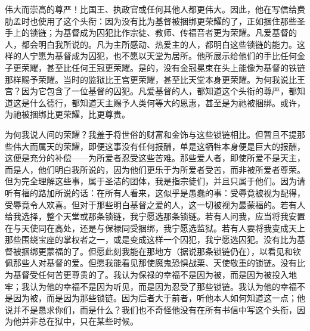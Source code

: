 伟大而崇高的尊严！比国王、执政官或任何其他人都更伟大。因此，他在写信给费肋孟时也使用了这个头衔：因为没有比为基督被捆绑更荣耀的了，正如捆住那些圣手上的锁链；为基督成为囚犯比作宗徒、教师、传福音者更为荣耀。凡爱基督的人，都会明白我所说的。凡为主所感动、热爱主的人，都明白这些锁链的能力。这样的人宁愿为基督成为囚犯，也不愿以天堂为居所。他所展示给他们的手比任何金子更荣耀，甚至比任何王冠更荣耀。是的，没有金冠冕束在头上能像为基督的铁链那样赐予荣耀。当时的监狱比王宫更荣耀，甚至比天堂本身更荣耀。为何我说比王宫？因为它包含了一位基督的囚犯。凡爱基督的人，都知道这个头衔的尊严，都知道这是什么德行，都知道天主赐予人类何等大的恩惠，甚至是为祂被捆绑。或许，为祂被捆绑比更荣耀，比更尊贵。\par

为何我说人间的荣耀？我羞于将世俗的财富和金饰与这些锁链相比。但暂且不提那些伟大而属天的荣耀，即便这事没有任何报酬，单是这牺牲本身便是巨大的报酬，这便是充分的补偿——为所爱者忍受这些苦难。那些爱人者，即使所爱不是天主，而是人，他们明白我所说的，因为他们更乐于为所爱者受苦，而非被所爱者尊荣。但为完全理解这些事，属于圣洁的团体，我是指宗徒们，并且只属于他们。因为请听有福的路加所说的话：在所有人看来，这似乎是愚蠢的事：受辱竟被视为配得，受辱竟令人欢喜。但对于那些明白基督之爱的人，这一切被视为最蒙福的。若有人给我选择，整个天堂或那条锁链，我宁愿选那条锁链。若有人问我，应当将我安置在与天使同在高处，还是与保禄同受捆绑，我宁愿选监狱。若有人要将我变成天上那些围绕宝座的掌权者之一，或是变成这样一个囚犯，我宁愿选囚犯。没有比为基督被捆绑更蒙福的了。但愿此刻我能在那地方（据说那条锁链仍在），以看见和钦佩那些人对基督的爱。但愿我能看见那使魔鬼恐惧战栗、天使敬重的锁链。没有比为基督受任何苦更尊贵的了。我认为保禄的幸福不是因为被，而是因为被投入地牢；我认为他的幸福不是因为听见，而是因为忍受了那些锁链。我认为他的幸福不是因为被，而是因为那些锁链。因为后者大于前者，听他本人如何知道这一点；他说并不是恳求你们，而是什么？我们也不奇怪他没有在所有书信中写这个头衔，因为他并非总在狱中，只在某些时候。\par

